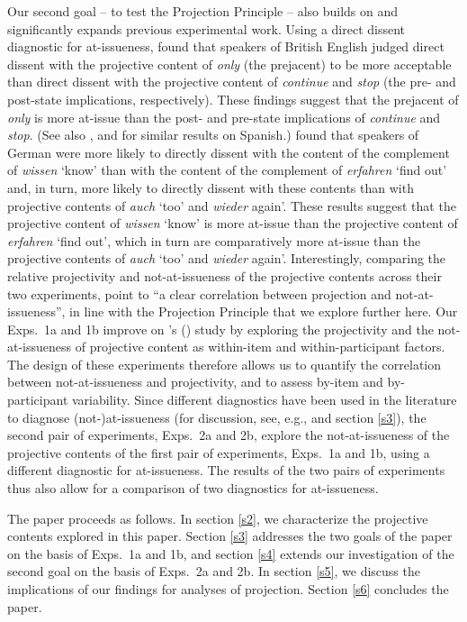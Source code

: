 \documentclass[11pt,fleqn]{article}
\newcommand{\6}{\mbox{$[\hspace*{-.6mm}[$}}
\newcommand{\9}{\mbox{$]\hspace*{-.6mm}]$}}
\newcommand{\citetpos}[1]{\citeauthor{#1}'s (\citeyear{#1})}
\begin{document}
Our second goal -- to test the Projection Principle -- also builds on and significantly expands previous experimental work. 
 Using a direct dissent diagnostic for at-issueness, \citet{amaral-etal11} found that speakers of British English judged direct dissent with the projective content of {\em only} (the prejacent) to be more acceptable than direct dissent with the projective content of {\em continue} and {\em stop} (the pre- and post-state implications, respectively). These findings suggest that the prejacent of {\em only} is more at-issue than the post- and pre-state implications of {\em continue} and {\em stop}. (See also \citealt{cummins-etal2012}, and \citealt{amaral-cummins2015} for similar results on Spanish.) \citet{xue-onea11} found that speakers of German were more likely to directly dissent with the content of the complement of {\em wissen} `know' than with the content of the complement of {\em erfahren} `find out' and, in turn, more likely to directly dissent with these contents than with projective contents of {\em auch} `too' and {\em wieder} again'. These results suggest that the projective content of {\em wissen} `know' is more at-issue than the projective content of {\em erfahren} `find out', which in turn are comparatively more at-issue than the projective contents of {\em auch} `too' and {\em wieder} again'. Interestingly, comparing the relative projectivity and not-at-issueness 
of the projective contents across their two experiments, \citet[180]{xue-onea11} point to ``a clear correlation between projection and not-at-issueness'', in line with the Projection Principle that we explore further here. Our Exps.~1a and 1b improve on \citetpos{xue-onea11} study by exploring the projectivity and the not-at-issueness of projective content as within-item and within-participant factors. The design of these experiments therefore allows us to quantify the correlation between not-at-issueness and projectivity, and to assess by-item and by-participant variability. Since different diagnostics have been used in the literature to diagnose (not-)at-issueness (for discussion, see, e.g., \citealt{tonhauser-sula6} and section \ref{s3}), the second pair of experiments, Exps.~2a and 2b, explore the not-at-issueness of the projective contents of the first pair of experiments, Exps.~1a and 1b, using a different diagnostic for at-issueness. The results of the two pairs of experiments thus also allow for a comparison of two diagnostics for at-issueness.

The paper proceeds as follows. In section \ref{s2}, we characterize the projective contents explored in this paper. Section \ref{s3} addresses the two goals of the paper on the basis of Exps.~1a and 1b, and section \ref{s4} extends our investigation of the second goal on the basis of Exps.~2a and 2b. In section \ref{s5}, we discuss the implications of our findings for analyses of projection. Section \ref{s6} concludes the paper.
\end{document}
